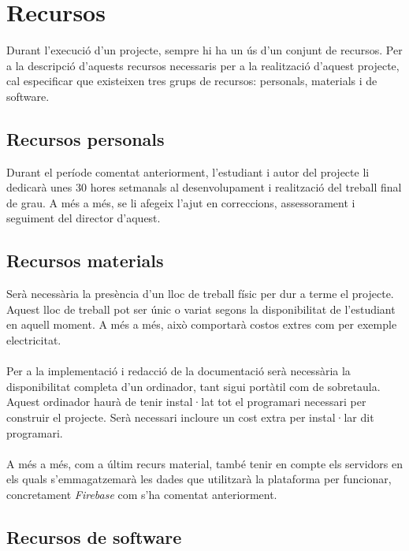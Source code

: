
\section{Recursos}

Durant l'execució d'un projecte, sempre hi ha un ús d'un conjunt de recursos. Per a la descripció d'aquests recursos necessaris per a la realització d'aquest projecte, cal especificar que existeixen tres grups de recursos: personals, materials i de software.

\clearpage
\subsection{Recursos personals}

Durant el període comentat anteriorment, l'estudiant i autor del projecte li dedicarà unes 30 hores setmanals al desenvolupament i realització del treball final de grau. A més a més, se li afegeix l'ajut en correccions, assessorament i seguiment del director d'aquest.

\subsection{Recursos materials}

Serà necessària la presència d'un lloc de treball físic per dur a terme el projecte. Aquest lloc de treball pot ser únic o variat segons la disponibilitat de l'estudiant en aquell moment. A més a més, això comportarà costos extres com per exemple electricitat.
\\\\
Per a la implementació i redacció de la documentació serà necessària la disponibilitat completa d'un ordinador, tant sigui portàtil com de sobretaula. Aquest ordinador haurà de tenir instal·lat tot el programari necessari per construir el projecte. Serà necessari incloure un cost extra per instal·lar dit programari.
\\\\
A més a més, com a últim recurs material, també tenir en compte els servidors en els quals s'emmagatzemarà les dades que utilitzarà la plataforma per funcionar, concretament \textit{Firebase} com s'ha comentat anteriorment.

\subsection{Recursos de software}

